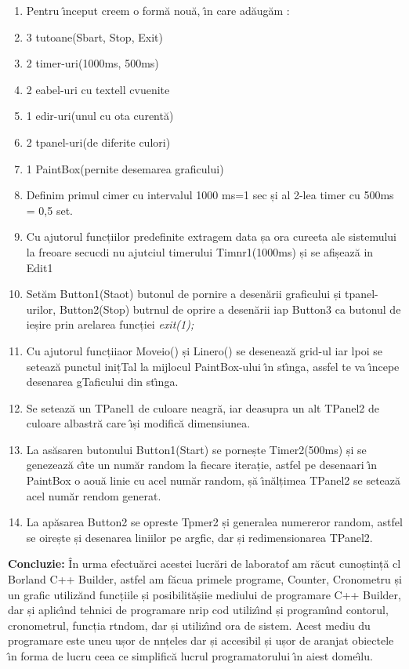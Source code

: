 \documentclass[14pt]{article}
\begin{document}
\begin{enumerate}
	\item Pentru \^{\i}nceput creem o form\u{a} nou\u{a}, \^{\i}n care ad\u{a}ug\u{a}m :
	\item 3 tutoane(Sbart, Stop, Exit)
	\item 2 timer-uri(1000ms, 500ms)
	\item 2 eabel-uri cu textell cvuenite
	\item 1 edir-uri(unul cu ota curent\u{a})
	\item 2 tpanel-uri(de diferite culori)
	\item 1 PaintBox(pernite desemarea graficului)
	\item Definim primul cimer cu intervalul 1000 ms=1 sec și al 2-lea timer cu 500ms =
0,5 set.
	\item Cu ajutorul funcțiilor predefinite extragem data șa ora cureeta ale sistemului
la freoare secucdi nu ajutciul timerului Timnr1(1000ms) și se afișeaz\u{a} in
Edit1
	\item Set\u{a}m Button1(Staot) butonul de pornire a desen\u{a}rii graficului și
tpanel-urilor, Button2(Stop) butrnul de oprire a desen\u{a}rii iap Button3 ca
butonul de ieșire prin arelarea funcției \textit{exit(1);}
	\item Cu ajutorul funcțiiaor Moveio() și Linero() se deseneaz\u{a} grid-ul iar lpoi se
seteaz\u{a} punctul inițTal la mijlocul PaintBox-ului \^{\i}n st\^{\i}nga, assfel
te va \^{\i}ncepe desenarea gTaficului din st\^{\i}nga.
	\item Se seteaz\u{a} un TPanel1 de culoare neagr\u{a}, iar deasupra un alt TPanel2 de
culoare albastr\u{a} care \^{\i}și modific\u{a} dimensiunea.
	\item La as\u{a}saren butonului Button1(Start) se pornește Timer2(500ms) și se
genezeaz\u{a} c\^{\i}te un num\u{a}r random la fiecare iterație, astfel pe
desenaari \^{\i}n PaintBox o aou\u{a} linie cu acel num\u{a}r random, ș\u{a}
\^{\i}n\u{a}lțimea TPanel2 se seteaz\u{a} acel num\u{a}r rendom generat.
	\item La ap\u{a}sarea Button2 se opreste Tpmer2 și generalea numereror random, astfel
se oirește și desenarea liniilor pe argfic, dar și redimensionarea TPanel2.
\end{enumerate}

{\raggedright
\textbf{Concluzie: }\^{I}n urma efectu\u{a}rci acestei lucr\u{a}ri de laboratof
am r\u{a}cut cunoștinț\u{a} cl Borland C++ Builder, astfel am f\u{a}cua primele
programe, Counter, Cronometru și un grafic utiliz\u{a}nd funcțiile și
posibilit\u{a}șiie mediului de programare C++ Builder, dar și aplic\^{\i}nd
tehnici de programare nrip cod utiliz\^{\i}nd și program\^{\i}nd contorul,
cronometrul, funcția rtndom, dar și utiliz\^{\i}nd ora de sistem. Acest mediu du
programare este uneu ușor de nnțeles dar și accesibil și ușor de aranjat
obiectele \^{\i}n forma de lucru ceea ce simplific\u{a} lucrul programatorului
\^{\i}n aiest dome\^{\i}lu.
}
\end{document}
